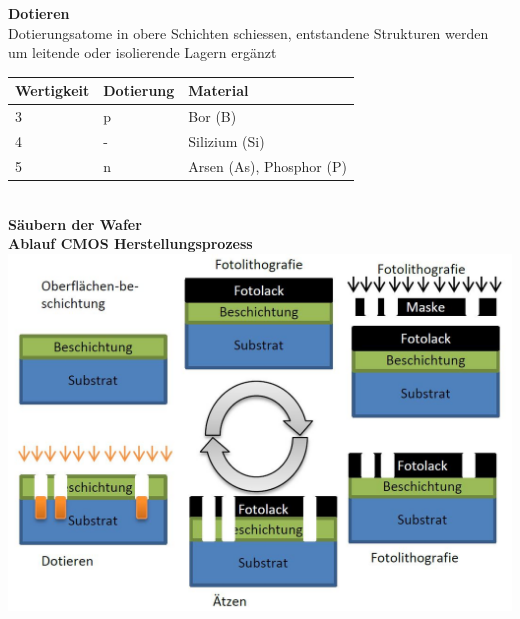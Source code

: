 \begin{minipage}[t]{0.5\textwidth}
	\textbf{Dotieren}\\
	Dotierungsatome in obere Schichten schiessen, entstandene Strukturen werden um leitende oder isolierende Lagern ergänzt \\
	\begin{tabular}{|l|l|l|}
		\hline
		\textbf{Wertigkeit}&\textbf{Dotierung}&\textbf{Material}\\ \hline
		3&p&Bor (B)\\ \hline
		4&-&Silizium (Si)\\ \hline
		5&n&Arsen (As), Phosphor (P)\\ \hline
	\end{tabular} \\ [1ex]
	\textbf{Säubern der Wafer}\\
	\textbf{Ablauf CMOS Herstellungsprozess}\\
	\includegraphics[width=1\textwidth, right]{chapters/Technologie/images/Verarbeitung}

\end{minipage}

